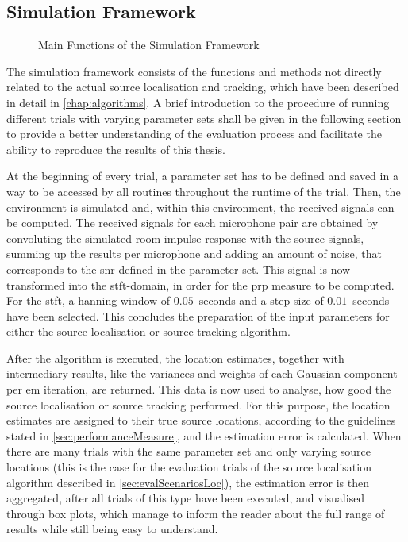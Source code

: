 \subsection{Simulation Framework}
\begin{figure}[H]
	\centering
	
	\caption{Main Functions of the Simulation Framework}
	\label{diag:simulationFramework}
\end{figure}

The simulation framework consists of the functions and methods not directly related to the actual source localisation and tracking, which have been described in detail in \autoref{chap:algorithms}. A brief introduction to the procedure of running different trials with varying parameter sets shall be given in the following section to provide a better understanding of the evaluation process and facilitate the ability to reproduce the results of this thesis.


At the beginning of every trial, a parameter set has to be defined and saved in a way to be accessed by all routines throughout the runtime of the trial. Then, the environment is simulated and, within this environment, the received signals can be computed. The received signals for each microphone pair are obtained by convoluting the simulated room impulse response with the source signals, summing up the results per microphone and adding an amount of noise, that corresponds to the \gls{snr} defined in the parameter set. This signal is now transformed into the \gls{stft}-domain, in order for the \gls{prp} measure to be computed. For the \gls{stft}, a hanning-window of $0.05$~seconds and a step size of $0.01$~seconds have been selected. This concludes the preparation of the input parameters for either the source localisation or source tracking algorithm.

After the algorithm is executed, the location estimates, together with intermediary results, like the variances and weights of each Gaussian component per \gls{em} iteration, are returned. This data is now used to analyse, how good the source localisation or source tracking performed. For this purpose, the location estimates are assigned to their true source locations, according to the guidelines stated in \autoref{sec:performanceMeasure}, and the estimation error is calculated. When there are many trials with the same parameter set and only varying source locations (this is the case for the evaluation trials of the source localisation algorithm described in \autoref{sec:evalScenariosLoc}), the estimation error is then aggregated, after all trials of this type have been executed, and visualised through box plots, which manage to inform the reader about the full range of results while still being easy to understand.

